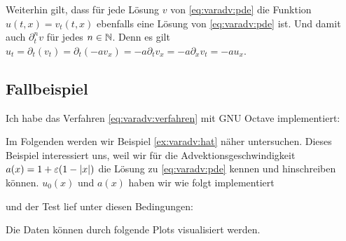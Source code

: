 Weiterhin gilt, dass für jede Lösung $v$ von \eqref{eq:varadv:pde} die Funktion $u(t,x) = v_t(t,x)$ ebenfalls eine Lösung von \eqref{eq:varadv:pde} ist.
Und damit auch $\partial^n_t v$ für jedes $n \in \mathbb N$.
Denn es gilt $u_t = \partial_t (v_t) = \partial_t(- a v_x) = - a \partial_t v_x = -a \partial_x v_t = -a u_x$.

\subsection{Fallbeispiel}

Ich habe das Verfahren \eqref{eq:varadv:verfahren} mit GNU Octave implementiert:
\vspace{0.4cm}

Im Folgenden werden wir Beispiel \ref{ex:varadv:hat} näher untersuchen.
Dieses Beispiel interessiert uns, weil wir für die Advektionsgeschwindigkeit $a(x) = 1 + \varepsilon (1 - \left| x \right|)$ die Lösung zu \eqref{eq:varadv:pde} kennen und hinschreiben können.
$u_0(x)$ und $a(x)$ haben wir wie folgt implementiert

und der Test lief unter diesen Bedingungen:

Die Daten können durch folgende Plots visualisiert werden.
\vspace{0.4cm}

\hspace{-1cm}


